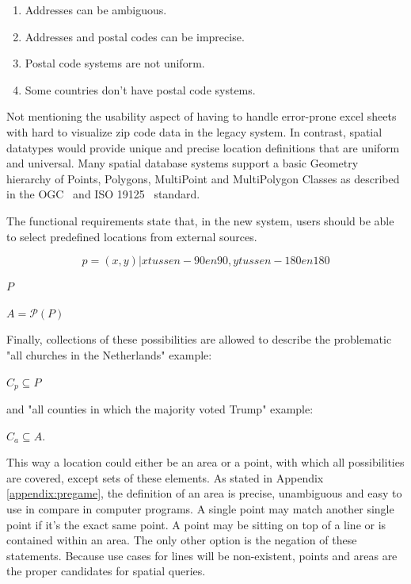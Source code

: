 \begin{enumerate}
	\item Addresses can be ambiguous.
	\item Addresses and postal codes can be imprecise.
	\item Postal code systems are not uniform.
	\item Some countries don't have postal code systems.
\end{enumerate}

Not mentioning the usability aspect of having to handle error-prone excel sheets with hard to visualize zip code data in the legacy system. In contrast, spatial datatypes would provide unique and precise location definitions that are uniform and universal. Many spatial database systems support a basic Geometry hierarchy of Points, Polygons, MultiPoint and MultiPolygon Classes as described in the OGC~\cite{SFA} and ISO 19125~\cite{ISO-19125} standard.


The functional requirements state that, in the new system, users should be able to select predefined locations from external sources.




\[p = {(x, y) | x tussen -90 en 90, y tussen -180 en 180 }\]

$P$

$A = \mathcal{P}(P)$

Finally, collections of these possibilities are allowed to describe the problematic "all churches in the Netherlands" example:

$C_p \subseteq P$

and "all counties in which the majority voted Trump" example:

$C_a \subseteq A$.

This way a location could either be an area or a point, with which all possibilities are covered, except sets of these elements. As stated in Appendix \ref{appendix:pregame}, the definition of an area is precise, unambiguous and easy to use in compare in computer programs. A single point may match another single point if it’s the exact same point. A point may be sitting on top of a line or is contained within an area. The only other option is the negation of these statements. Because use cases for lines will be non-existent, points and areas are the proper candidates for spatial queries.

